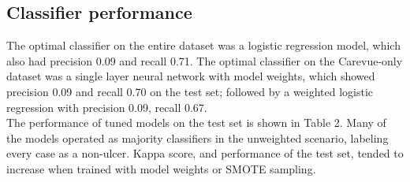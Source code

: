 \documentclass{ws-procs11x85}
\begin{document}
\newpage
\subsection{Classifier performance}
The optimal classifier on the entire dataset was a logistic regression model, which also had precision 0.09 and recall 0.71. The optimal classifier on the Carevue-only dataset was a single layer neural network with model weights, which showed precision 0.09 and recall 0.70 on the test set; followed by a  weighted logistic regression with precision 0.09, recall 0.67. \\

\noindent
The performance of tuned models on the test set is shown in Table 2. Many of the models operated as majority classifiers in the unweighted scenario, labeling every case as a non-ulcer. Kappa score, and performance of the test set, tended to increase when trained with model weights or SMOTE sampling. 
\end{document}
